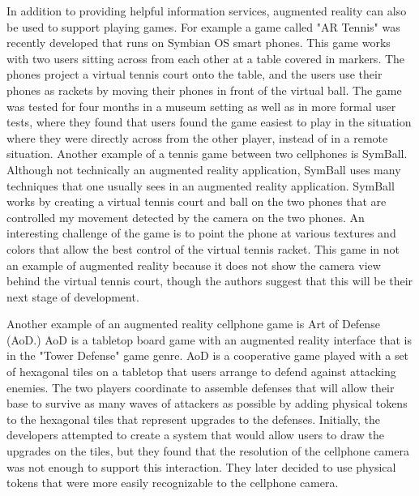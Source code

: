 \documentclass{acm_proc_article-sp}
\begin{document}
In addition to providing helpful information services, augmented reality can also be used to support playing games.  For example a game called "AR Tennis" was recently developed that runs on Symbian OS smart phones.  This game works with two users sitting across from each other at a table covered in markers.  The phones project a virtual tennis court onto the table, and the users use their phones as rackets by moving their phones in front of the virtual ball.  The game was tested for four months in a museum setting as well as in more formal user tests, where they found that users found the game easiest to play in the situation where they were directly across from the other player, instead of in a remote situation.\cite{henrysson2005face}  Another example of a tennis game between two cellphones is SymBall.  Although not technically an augmented reality application, SymBall uses many techniques that one usually sees in an augmented reality application.  SymBall works by creating a virtual tennis court and ball on the two phones that are controlled my movement detected by the camera on the two phones.  An interesting challenge of the game is to point the phone at various textures and colors that allow the best control of the virtual tennis racket. This game in not an example of augmented reality because it does not show the camera view behind the virtual tennis court, though the authors suggest that this will be their next stage of development. \cite{hakkarainen2005symball} 

Another example of an augmented reality cellphone game is Art of Defense (AoD.) AoD is a tabletop board game with an augmented reality interface that is in the "Tower Defense" game genre.  AoD is a cooperative game played with a set of hexagonal tiles on a tabletop that users arrange to defend against attacking enemies.  The two players coordinate to assemble defenses that will allow their base to survive as many waves of attackers as possible by adding physical tokens to the hexagonal tiles that represent upgrades to the defenses.  Initially, the developers attempted to create a system that would allow users to draw the upgrades on the tiles, but they found that the resolution of the cellphone camera was not enough to support this interaction. They later decided to use physical tokens that were more easily recognizable to the cellphone camera.  \cite{huynh2009art}
\end{document}
